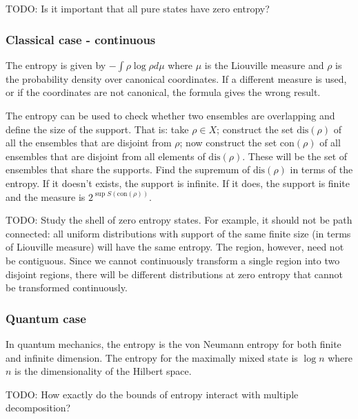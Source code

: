 TODO: Is it important that all pure states have zero entropy?

\subsubsection{Classical case - continuous}

The entropy is given by $- \int \rho \log \rho d\mu$ where $\mu$ is the Liouville measure and $\rho$ is the probability density over canonical coordinates. If a different measure is used, or if the coordinates are not canonical, the formula gives the wrong result.

The entropy can be used to check whether two ensembles are overlapping and define the size of the support. That is: take $\rho \in X$; construct the set $\text{dis}(\rho)$ of all the ensembles that are disjoint from $\rho$; now construct the set $\text{con}(\rho)$ of all ensembles that are disjoint from all elements of $\text{dis}(\rho)$. These will be the set of ensembles that share the supports. Find the supremum of $\text{dis}(\rho)$ in terms of the entropy. If it doesn't exists, the support is infinite. If it does, the support is finite and the measure is $2^{\sup S(\text{con}(\rho))}$.

TODO: Study the shell of zero entropy states. For example, it should not be path connected: all uniform distributions with support of the same finite size (in terms of Liouville measure) will have the same entropy. The region, however, need not be contiguous. Since we cannot continuously transform a single region into two disjoint regions, there will be different distributions at zero entropy that cannot be transformed continuously.

\subsubsection{Quantum case}

In quantum mechanics, the entropy is the von Neumann entropy for both finite and infinite dimension. The entropy for the maximally mixed state is $\log n$ where $n$ is the dimensionality of the Hilbert space.

TODO: How exactly do the bounds of entropy interact with multiple decomposition?

